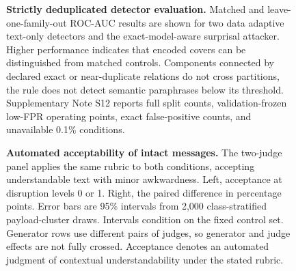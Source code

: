 \documentclass[fleqn,10pt]{wlscirep}
\begin{document}
\begin{figure}[H]
\caption{\label{fig:detector}\textbf{Strictly deduplicated detector evaluation.} Matched and leave-one-family-out ROC-AUC results are shown for two data adaptive text-only detectors and the exact-model-aware surprisal attacker. Higher performance indicates that encoded covers can be distinguished from matched controls. Components connected by declared exact or near-duplicate relations do not cross partitions, the rule does not detect semantic paraphrases below its threshold. Supplementary Note S12 reports full split counts, validation-frozen low-FPR operating points, exact false-positive counts, and unavailable 0.1\% conditions.}
\end{figure}
\begin{figure}[H]
\caption{\textbf{Automated acceptability of intact messages.} The two-judge panel applies the same rubric to both conditions, accepting understandable text with minor awkwardness. Left, acceptance at disruption levels 0 or 1. Right, the paired difference in percentage points. Error bars are 95\% intervals from 2,000 class-stratified payload-cluster draws. Intervals condition on the fixed control set. Generator rows use different pairs of judges, so generator and judge effects are not fully crossed. Acceptance denotes an automated judgment of contextual understandability under the stated rubric.}\label{fig:v4-contextual}
\end{figure}
\end{document}
